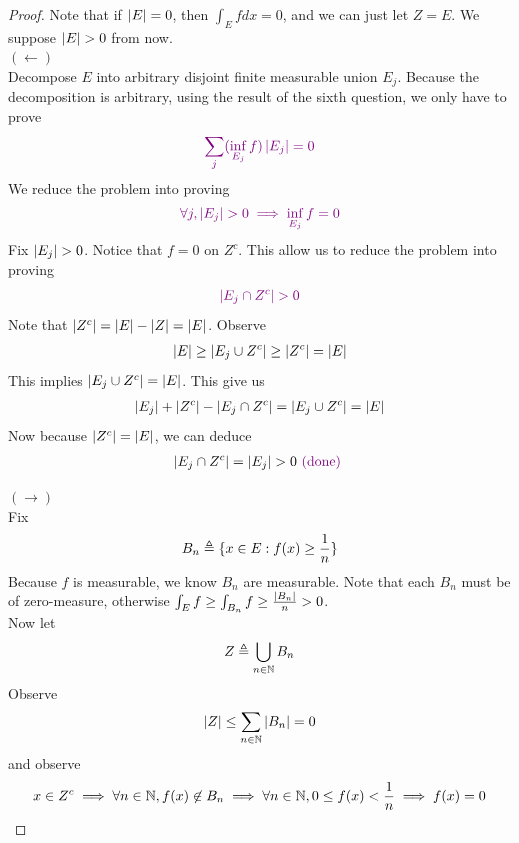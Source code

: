 \documentclass{report}
\begin{document}
\begin{proof}
Note that if $\left|E\right|=0$, then $\int_E fdx=0$, and we can just let $Z=E$. We suppose $\abso{E}>0$ from now.\\


$(\longleftarrow)$\\


Decompose $E$ into arbitrary disjoint finite measurable union $E_j$. Because the decomposition is arbitrary, using the result of the sixth question, we only have to prove 
\begin{align*}
  \textcolor{violet}{\sum_{j} (\inf_{E_j} f)\left|E_j\right|=0}
\end{align*}
We reduce the problem into proving 
\begin{align*}
\vi{\forall j, \abso{E_j}>0 \implies \inf_{E_j}f=0}
\end{align*}
Fix $\abso{E_j}>0$. Notice that $f=0$ on $Z^c$. This allow us to reduce the problem into proving 
\begin{align*}
  \vi{\abso{E_j\cap Z^c}>0}
\end{align*}
Note that $\left|Z^c\right|=\left|E\right|-\left|Z\right|=\left|E\right|$. Observe 
\begin{align*}
  \left|E\right|\geq \left|E_j\cup Z^c\right|\geq \left|Z^c\right|=\left|E\right|
\end{align*}
This implies $\left|E_j \cup Z^c\right|=\left|E\right|$. This give us 
 \begin{align*}
\left|E_j\right|+\left|Z^c\right|- \left|E_j\cap Z^c\right|= \left|E_j\cup Z^c\right|=\left|E\right|
\end{align*}
Now because $\left|Z^c\right|=\left|E\right|$, we can deduce 
\begin{align*}
\abso{E_j\cap Z^c}= \abso{E_j}>0 \vdone
\end{align*}

$(\longrightarrow)$\\

Fix 
\begin{align*}
B_n\triangleq \{ x \in E: f(x)\geq \frac{1}{n} \}
\end{align*}
Because  $f$ is measurable, we know  $B_n$ are measurable. Note that each $B_n$ must be of zero-measure, otherwise  $\int_E f\geq \int_{B_n}f\geq \frac{\left|B_n\right|}{n}>0$.\\

Now let 
\begin{align*}
Z\triangleq \bigcup_{n\in\mathbb{N}} B_n
\end{align*}
Observe 
\begin{align*}
\left|Z\right|\leq \sum_{n\in\mathbb{N}} \left|B_n\right|=0
\end{align*}
and observe 
\begin{align*}
x \in Z^c \implies \forall n\in\mathbb{N}, f(x) \not\in B_n \implies \forall n\in\mathbb{N}, 0\leq f(x) < \frac{1}{n}\implies f(x)=0
\end{align*}




\end{proof}
\end{document}
